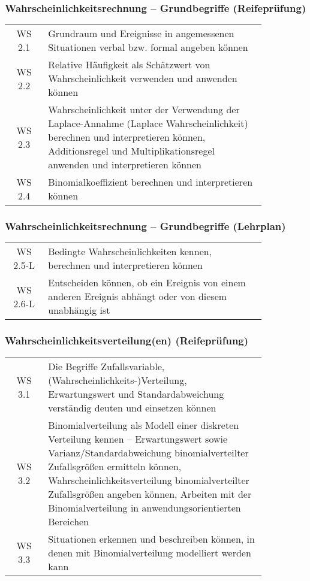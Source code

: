 \documentclass[a4paper,12pt]{article}
\begin{document}
\subsubsection{Wahrscheinlichkeitsrechnung -- Grundbegriffe (Reifeprüfung)}
\begin{tabular}{cp{0.85\linewidth}}
WS 2.1 & Grundraum und Ereignisse in angemessenen Situationen verbal bzw. formal angeben können\\
WS 2.2 & Relative Häufigkeit als Schätzwert von Wahrscheinlichkeit verwenden und anwenden können\\
WS 2.3 & Wahrscheinlichkeit unter der Verwendung der Laplace-Annahme (Laplace Wahrscheinlichkeit) berechnen und interpretieren können, Additionsregel und Multiplikationsregel anwenden und interpretieren können\\
WS 2.4 & Binomialkoeffizient berechnen und interpretieren können\\
\end{tabular}


\subsubsection{Wahrscheinlichkeitsrechnung -- Grundbegriffe (Lehrplan)}
\begin{em}
\begin{tabular}{cp{0.85\linewidth}}
WS 2.5-L & Bedingte Wahrscheinlichkeiten kennen, berechnen und interpretieren können\\
WS 2.6-L & Entscheiden können, ob ein Ereignis von einem anderen Ereignis abhängt oder von diesem unabhängig ist\\
\end{tabular}
\end{em}


\subsubsection{Wahrscheinlichkeitsverteilung(en) (Reifeprüfung)}
\begin{tabular}{cp{0.85\linewidth}}
WS 3.1 & Die Begriffe Zufallsvariable, (Wahrscheinlichkeits-)Verteilung, Erwartungswert und Standardabweichung verständig deuten und einsetzen können\\
WS 3.2 & Binomialverteilung als Modell einer diskreten Verteilung kennen -- Erwartungswert sowie Varianz/Standardabweichung binomialverteilter Zufallsgrößen ermitteln können, Wahrscheinlichkeitsverteilung binomialverteilter Zufallsgrößen angeben können, Arbeiten mit der Binomialverteilung in anwendungsorientierten Bereichen\\
WS 3.3 & Situationen erkennen und beschreiben können, in denen mit Binomialverteilung modelliert werden kann\\
\end{tabular}
\end{document}
